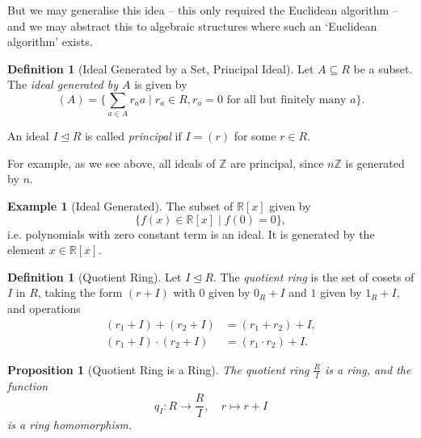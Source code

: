 \documentclass{article}
\newtheorem{proposition}[theorem]{Proposition}
\theoremstyle{definition}
\newtheorem{definition}[theorem]{Definition}
\newtheorem{example}[theorem]{Example}
\theoremstyle{remark}
\newcommand{\pqty}[1]{\left(#1\right)}
\newcommand{\bqty}[1]{\left[#1\right]}
\newcommand{\set}[2]{\{#1\mid #2\}}
\newcommand{\flatfrac}[2]{\frac{#1}{#2}}
\newcommand{\function}[5]{#1:#2\to #3,\quad #4\mapsto #5}
\newcommand{\idealsub}{\trianglelefteq}
\newcommand{\ZZ}{\mathbb{Z}}
\newcommand{\RR}{\mathbb{R}}
\begin{document}
But we may generalise this idea -- this only required the Euclidean algorithm -- and we may abstract this to algebraic structures where such an `Euclidean algorithm' exists.

\begin{definition}[Ideal Generated by a Set, Principal Ideal]
    \label{def:ideal-generated-principal}%
    Let \(A \subseteq R\) be a subset. The \emph{ideal generated by \(A\)} is given by
    \[
        \pqty{A} = \set{\sum_{a \in A} r_a a}{r_a \in R, r_a = 0 \text{ for all but finitely many }a}.
    \]

    An ideal \(I \idealsub R\) is called \emph{principal} if \(I = \pqty{r}\) for some \(r \in R\).
\end{definition}

For example, as we see above, all ideals of \(\ZZ\) are principal, since \(n\ZZ\) is generated by \(n\).

\begin{example}[Ideal Generated]
    \label{ex:ideal-generated}%
    The subset of \(\RR\bqty{x}\) given by
    \[
        \set{f\pqty{x} \in \RR\bqty{x}}{f\pqty{0} = 0},
    \]
    i.e. polynomials with zero constant term is an ideal. It is generated by the element \(x \in \RR\bqty{x}\).
\end{example}

\begin{definition}[Quotient Ring]
    \label{def:quotient-ring}%
    Let \(I \idealsub R\). The \emph{quotient ring} is the set of cosets of \(I\) in \(R\), taking the form \(\pqty{r + I}\) with \(0\) given by \(0_R + I\) and \(1\) given by \(1_R + I\), and operations
    \begin{align*}
        \pqty{r_1 + I} + \pqty{r_2 + I} &= \pqty{r_1 + r_2} + I, \\
        \pqty{r_1 + I} \cdot \pqty{r_2 + I} &= \pqty{r_1 \cdot r_2} + I.
    \end{align*}
\end{definition}

\begin{proposition}[Quotient Ring is a Ring]
    \label{prop:quotient-ring-ring}%
    The quotient ring \(\flatfrac{R}{I}\) is a ring, and the function
    \[
        \function{q_I}{R}{\flatfrac{R}{I}}{r}{r + I}
    \]
    is a ring homomorphism.
\end{proposition}
\end{document}
